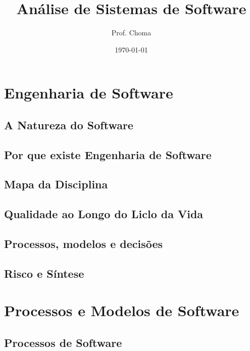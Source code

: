 \documentclass[12pt]{article}
\title{Análise de Sistemas de Software}
\author{Prof. Choma}
\date{\today}
\begin{document}
\maketitle
\tableofcontents

\section{Engenharia de Software}
\subsection{A Natureza do Software}





\subsection{Por que existe Engenharia de Software}





\subsection{Mapa da Disciplina}





\subsection{Qualidade ao Longo do Liclo da Vida}





\subsection{Processos, modelos e decisões}





\subsection{Risco e Síntese}





\section{Processos e Modelos de Software}
\subsection{Processos de Software}
\end{document}
